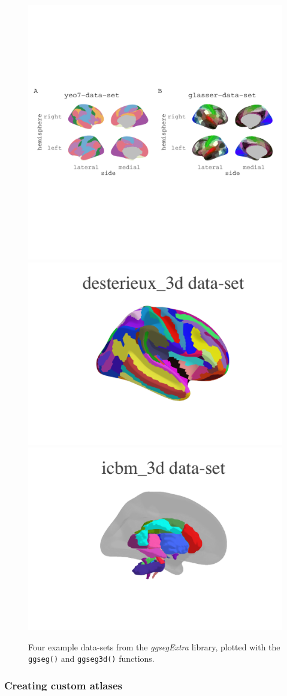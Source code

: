 \documentclass[fleqn,10pt]{wlpeerj} %
\begin{document}
\begin{figure}[H]
\includegraphics[width=0.8\linewidth]{msc_ggseg_files/figure-latex/figure10ab} \includegraphics[width=0.4\linewidth]{msc_ggseg_files/figure-latex/figure10c} \includegraphics[width=0.4\linewidth]{msc_ggseg_files/figure-latex/figure10d} \caption{Four example data-sets from the \emph{ggsegExtra} library, plotted with the \texttt{ggseg()} and \texttt{ggseg3d()} functions.}\label{fig:figure10}
\end{figure}

\hypertarget{creating-custom-atlases}{%
\subsubsection{Creating custom atlases}\label{creating-custom-atlases}}
\end{document}
